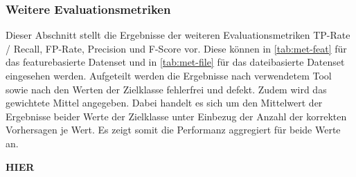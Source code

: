 \subsubsection*{Weitere Evaluationsmetriken}

Dieser Abschnitt stellt die Ergebnisse der weiteren Evaluationsmetriken TP-Rate / Recall, FP-Rate, Precision und F-Score vor. Diese können in \autoref{tab:met-feat} für das featurebasierte Datenset und in \autoref{tab:met-file} für das dateibasierte Datenset eingesehen werden. Aufgeteilt werden die Ergebnisse nach verwendetem Tool sowie nach den Werten der Zielklasse \glqq fehlerfrei\grqq{} und \glqq defekt\grqq. Zudem wird das gewichtete Mittel angegeben. Dabei handelt es sich um den Mittelwert der Ergebnisse beider Werte der Zielklasse unter Einbezug der Anzahl der korrekten Vorhersagen je Wert. Es zeigt somit die Performanz aggregiert für beide Werte an. 

\textbf{HIER}


